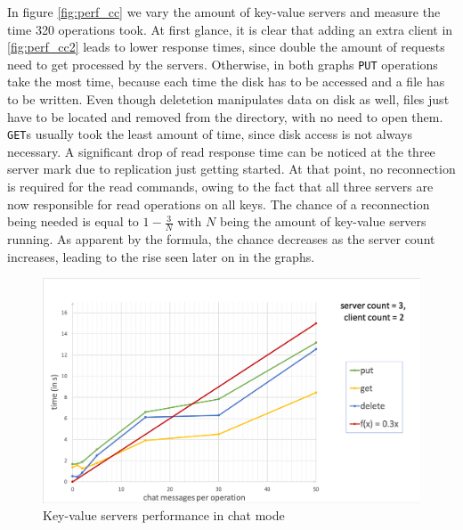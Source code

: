 In figure \ref{fig:perf_cc}  we vary the amount of key-value servers and measure the time 320 operations took. At first glance, it is clear that adding an extra client in \ref{fig:perf_cc2} leads to lower response times, since double the amount of requests need to get processed by the servers. Otherwise, in both graphs \texttt{PUT} operations take the most time, because each time the disk has to be accessed and a file has to be written. Even though deletetion manipulates data on disk as well, files just have to be located and removed from the directory, with no need to open them. \texttt{GET}s usually took the least amount of time, since disk access is not always necessary. A significant drop of read response time can be noticed at the three server mark due to replication just getting started. At that point, no reconnection is required for the read commands, owing to the fact that all three servers are now responsible for read operations on all keys. The chance of a reconnection being needed is equal to \begin{math}1-\frac{3}{N}\end{math} with \begin{math}N\end{math} being the amount of key-value servers running. As apparent by the formula, the chance decreases as the server count increases, leading to the rise seen later on in the graphs. 


\begin{figure}[h]
	\centering
	\includegraphics[width=\linewidth]{figures/chat(linear).png}
	\caption{Key-value servers performance in chat mode}
	\label{fig:perf_chat_lin}
\end{figure}


